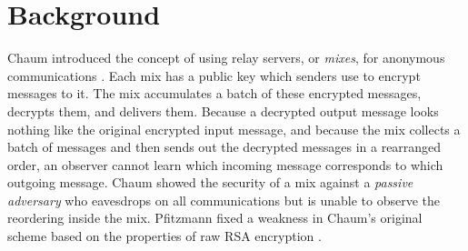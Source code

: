 \documentclass[final,inpress,inline]{ieee}
\begin{document}


%


\section{Background}
\label{sec:background}

Chaum introduced the concept of using relay servers, or \emph{mixes},
for anonymous communications \cite{chaum-mix}. Each mix has a public key
which senders use to encrypt messages to it. The mix accumulates a batch
of these encrypted messages, decrypts them, and delivers them. Because
a decrypted output message looks nothing like the original encrypted
input message,
and because the mix collects a batch of messages and then sends out the
decrypted messages in a rearranged order, an observer cannot learn which incoming
message corresponds to which outgoing message. Chaum showed the
security of a mix against a \emph{passive adversary} who eavesdrops on
all communications but is unable to observe the reordering inside the mix.
Pfitzmann fixed a weakness in Chaum's original scheme based on the
properties of raw RSA encryption \cite{pfitzmann90how}.
\end{document}
